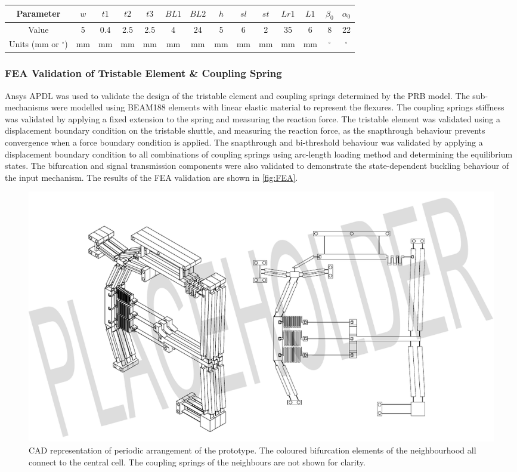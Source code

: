 \begin{tabular}{|c|c|c|c|c|c|c|c|c|c|c|c|c|c|}
    \hline
    Parameter & \( w \) & \( t1 \) & \( t2 \) & \( t3 \) & \( BL1 \) & \( BL2 \) & \( h \) & \( sl \) & \( st \) & \( Lr1 \) & \( L1 \) & \( \beta_0 \) & \( \alpha_0 \) \\
    \hline
    Value & 5 & 0.4 & 2.5 & 2.5 & 4 & 24 & 5 & 6 & 2 & 35 & 6 & 8 & 22 \\
    \hline
    Units (mm or \( ^\circ \)) & mm & mm & mm & mm & mm & mm & mm & mm & mm & mm & mm & \( ^\circ \) & \( ^\circ \) \\
    \hline
    \end{tabular}

\subsubsection*{FEA Validation of Tristable Element \& Coupling Spring}

Ansys APDL was used to validate the design of the tristable element and coupling springs determined by the PRB model. The sub-mechanisms were modelled using BEAM188 elements with linear elastic material to represent the flexures.  The coupling springs stiffness was validated by applying a fixed extension to the spring and measuring the reaction force. The tristable element was validated using a displacement boundary condition on the tristable shuttle, and measuring the reaction force, as the snapthrough behaviour prevents convergence when a force boundary condition is applied. The snapthrough and bi-threshold behaviour was validated by applying a displacement boundary condition to all combinations of coupling springs using arc-length loading method and determining the equilibrium states. The bifurcation and signal transmission components were also validated to demonstrate the state-dependent buckling behaviour of the input mechanism. The results of the FEA validation are shown in \autoref*{fig:FEA}.

\begin{figure}
    \centering
    \includegraphics[width=\textwidth]{images/SVGs/v5Assembly.pdf}
    \caption{CAD representation of periodic arrangement of the prototype. The coloured bifurcation elements of the neighbourhood all connect to the central cell. The coupling springs of the neighbours are not shown for clarity. }
    \label{fig:Prototype}
\end{figure}
